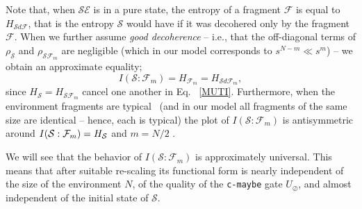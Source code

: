 \documentclass[aps,prl,showpacs,amsmath,amssymb,amsfonts,lengthcheck,twocolumn,longbibliography,superscriptaddress]{revtex4-2}
\newcommand{\cS}        {{\mathcal S}}
\newcommand{\cE}        {{\mathcal E}}
\newcommand{\+}         {\dagger}
\newcommand\cF{{\mathcal F}}
\newcommand{\mc}[1]{\mathcal{#1}}
\begin{document}
Note that, when $\cS \cE$ is in a pure state,  the entropy of a fragment $\cF$ is equal to $H_{\cS d\cF}$, that is the entropy $\cS$ would have if it was decohered only by the fragment $\cF$.  When we further assume {\it good decoherence} \cite{blume2005simple,ZQZ10} -- i.e., that the off-diagonal terms of $\rho_\cS$ and $\rho_{\cS \cF_m} $ are negligible (which in our model corresponds to $s^{N-m} \ll  s^m$) -- we obtain an approximate equality; 
\begin{equation}
I(\cS : \cF_m) = H_{\cF_m} = H_{\cS d \cF_m}, 
\label{gooddeco}
\end{equation}
since $H_\cS=H_{\cS \cF_m}$ cancel one another in Eq. ~\eqref{MUTI}.  Furthermore,  when the environment fragments are typical~\cite{CoverThomas} (and in our model all fragments of the same size are identical -- hence, each is typical) the plot of ${I}(\mc{S}:\mc{F}_m)$ is antisymmetric around ${I}(\mc{S}:\mc{F}_m) = H_{\cal S}$ and $m=N/2$ \cite{blume2005simple}.  

We will see that the behavior of  ${I}(\mc{S}:\mc{F}_m)$ is approximately universal. This means that after suitable re-scaling its functional form is nearly independent of the size of the environment $N$, of the quality of the {\tt c-maybe} gate $U_\oslash$, and almost independent of the initial state of $\cS$.
\end{document}

